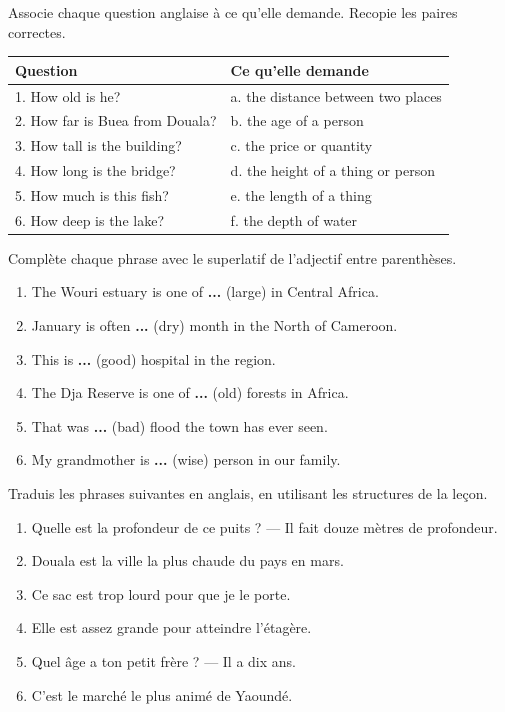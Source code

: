 \documentclass[11pt]{article}
\newcounter{popsec}
\newcounter{popsub}
\newcommand{\courssub}[1]{%
  \stepcounter{popsub}%
  \par\vspace{9pt}\noindent{\popxbold\fontsize{11.5}{13}\selectfont\color{popink}{\color{poporange}\thepopsec.\thepopsub}\hspace{6pt}#1}\par\nopagebreak\vspace{4pt}
}
\begin{document}
\begin{exercice}
Associe chaque question anglaise à ce qu'elle demande. Recopie les paires correctes.
\begin{center}
\begin{tabularx}{\linewidth}{|X|X|}
\hline
\rowcolor{popblueL} \textbf{Question} & \textbf{Ce qu'elle demande} \\
\hline
1. How old is he? & a. the distance between two places \\
\hline
2. How far is Buea from Douala? & b. the age of a person \\
\hline
3. How tall is the building? & c. the price or quantity \\
\hline
4. How long is the bridge? & d. the height of a thing or person \\
\hline
5. How much is this fish? & e. the length of a thing \\
\hline
6. How deep is the lake? & f. the depth of water \\
\hline
\end{tabularx}
\end{center}
\end{exercice}

\begin{exercice}
Complète chaque phrase avec le superlatif de l'adjectif entre parenthèses.
\begin{enumerate}
\item The Wouri estuary is one of \textbf{...} (large) in Central Africa.
\item January is often \textbf{...} (dry) month in the North of Cameroon.
\item This is \textbf{...} (good) hospital in the region.
\item The Dja Reserve is one of \textbf{...} (old) forests in Africa.
\item That was \textbf{...} (bad) flood the town has ever seen.
\item My grandmother is \textbf{...} (wise) person in our family.
\end{enumerate}
\end{exercice}

\courssub{Je m'entraîne}

\begin{exercice}[Traduction]
Traduis les phrases suivantes en anglais, en utilisant les structures de la leçon.
\begin{enumerate}
\item Quelle est la profondeur de ce puits ? — Il fait douze mètres de profondeur.
\item Douala est la ville la plus chaude du pays en mars.
\item Ce sac est trop lourd pour que je le porte.
\item Elle est assez grande pour atteindre l'étagère.
\item Quel âge a ton petit frère ? — Il a dix ans.
\item C'est le marché le plus animé de Yaoundé.
\end{enumerate}
\end{exercice}
\end{document}
